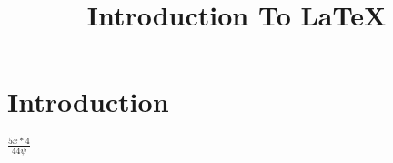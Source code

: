 \documentclass[options]{article}
\title{Introduction To LaTeX}
\begin{document}
\maketitle

\section{Introduction}

$ \frac{5x*4}{44\psi} $
\end{document}

